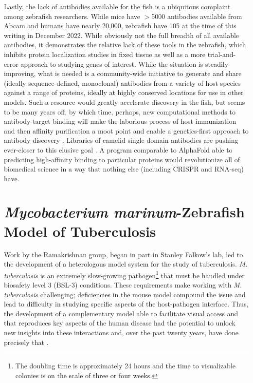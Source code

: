 Lastly, the lack of antibodies available for the fish is a ubiquitous complaint among zebrafish researchers. While mice have $>$5000 antibodies available from Abcam and humans have nearly 20,000, zebrafish have 105 at the time of this writing in December 2022. While obviously not the full breadth of all available antibodies, it demonstrates the relative lack of these tools in the zebrafish, which inhibits protein localization studies in fixed tissue as well as a more trial\hyp{}and\hyp{}error approach to studying genes of interest. While the situation is steadily improving, what is needed is a community\hyp{}wide initiative to generate and share (ideally sequence\hyp{}defined, monoclonal) antibodies from a variety of host species against a range of proteins, ideally at highly conserved locations for use in other models. Such a resource would greatly accelerate discovery in the fish, but seems to be many years off, by which time, perhaps, new computational methods to antibody\hyp{}target binding will make the laborious process of host immunization and then affinity purification a moot point and enable a genetics\hyp{}first approach to antibody discovery \citep{Wilman2022, Hummer2022, Akbar2022a, Akbar2022b, Shan2022}. Libraries of camelid single domain antibodies are pushing ever\hyp{}closer to this elusive goal \citep{ValdesTresanco2022, Moutel2016}. A program comparable to AlphaFold able to predicting high-affinity binding to particular proteins would revolutionize all of biomedical science in a way that nothing else (including CRISPR and RNA-seq) have.

\section{\textit{Mycobacterium marinum}\hyp{}Zebrafish Model of Tuberculosis}\label{zfmm}

Work by the Ramakrishnan group, began in part in Stanley Falkow's lab, led to the development of a heterologous model system for the study of tuberculosis. \textit{M. tuberculosis} is an extremely slow\hyp{}growing pathogen\footnote{The doubling time is approximately 24 hours and the time to visualizable colonies is on the scale of three or four weeks.} that must be handled under biosafety level 3 (BSL\hyp{}3) conditions. These requirements make working with \textit{M. tuberculosis} challenging; deficiencies in the mouse model compound the issue and lead to difficulty in studying specific aspects of the host\hyp{}pathogen interface. Thus, the development of a complementary model able to facilitate visual access and that reproduces key aspects of the human disease had the potential to unlock new insights into these interactions and, over the past twenty years, have done precisely that \citep{Myllymaki2016}.

